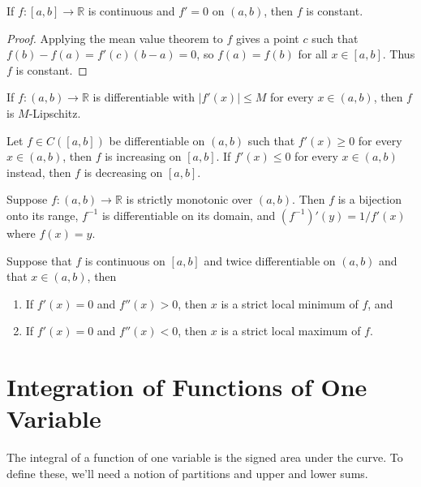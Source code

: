 \documentclass[10pt]{report}
\begin{document}
\begin{cor}
	If $f:[a,b] \to \mathbb{R}$ is continuous and $f'=0$ on $(a,b)$, then $f$ is constant.
\end{cor}
\begin{proof}
	Applying the mean value theorem to $f$ gives a point $c$ such that $f(b)-f(a) = f'(c)(b-a) = 0$, so $f(a) = f(b)$ for all $x \in [a,b]$. Thus $f$ is constant.
\end{proof}

\begin{cor}
	If $f:(a,b)\to\mathbb{R}$ is differentiable with $|f'(x)|\leq M$ for every $x \in (a,b)$, then $f$ is $M$-Lipschitz.
\end{cor}

\begin{prop}
	Let $f \in C([a,b])$ be differentiable on $(a,b)$ such that $f'(x) \geq 0$ for every $x \in (a,b)$, then $f$ is increasing on $[a,b]$. If $f'(x) \leq 0$ for every $x \in(a,b)$ instead, then $f$ is decreasing on $[a,b]$.
\end{prop}

\begin{thrm}
	Suppose $f:(a,b) \to \mathbb{R}$ is strictly monotonic over $(a,b)$. Then $f$ is a bijection onto its range, $f^{-1}$ is differentiable on its domain, and $(f^{-1})'(y) = 1/f'(x)$ where $f(x) = y$.
\end{thrm}

\begin{prop}
	Suppose that $f$ is continuous on $[a,b]$ and twice differentiable on $(a,b)$ and that $x \in (a,b)$, then
	\begin{enumerate}
		\item If $f'(x) = 0$ and $f''(x) > 0$, then $x$ is a strict local minimum of $f$, and
		\item If $f'(x) = 0$ and $f''(x) < 0$, then $x$ is a strict local maximum of $f$.
	\end{enumerate}
\end{prop}


\section{Integration of Functions of One Variable}

The integral of a function of one variable is the signed area under the curve. To define these, we'll need a notion of partitions and upper and lower sums.
\end{document}
